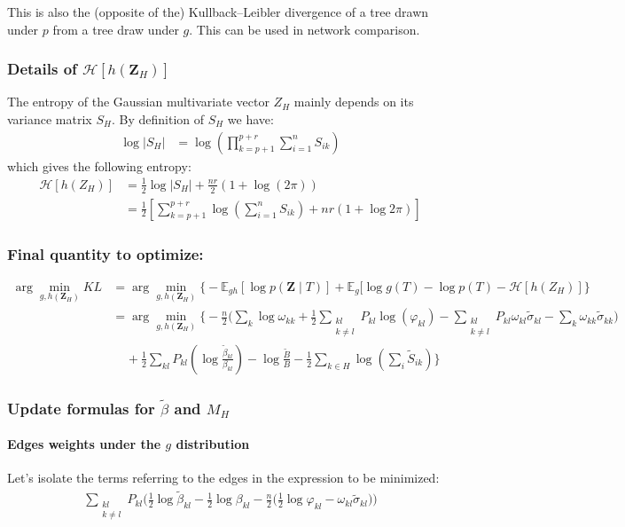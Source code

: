 \documentclass[11pt,a4paper]{article}
\newcommand{\argmin}{\arg\!\min}
\newcommand{\entr}{\mathcal{H}}
\newcommand{\Zbf}{\boldsymbol{Z}}
\newcommand{\Esp}{\mathds{E}}
\begin{document}
 
This is also the (opposite of the) Kullback–Leibler divergence of a tree drawn under $p$ from a tree draw under $g$. This can be used in network comparison.
 \subsubsection{Details of $\entr[h(\Zbf_H)]$}
 
 The entropy of the Gaussian multivariate vector $Z_H$ mainly depends on its variance matrix $S_H$. By definition of $S_H$ we have:
 \begin{align*}
 \log |S_H| &= \log(\prod_{k=p+1}^{p+r} \sum_{i=1}^n S_{ik})
\end{align*}
which gives the following entropy:
\begin{align*}
\entr[h(Z_H)]&= \frac{1}{2} \log |S_H| + \frac{nr}{2}(1+\log(2\pi))\\
 &=\frac{1}{2}\left[ \sum_{k=p+1}^{p+r} \log\left(\sum_{i=1}^n S_{ik}\right)+ nr(1+\log 2\pi )\right]
\end{align*}
\subsubsection{Final quantity to optimize:}
\begin{align*}
\argmin_{g,h(\Zbf_H)} KL  &=\argmin_{g,h(\Zbf_H)}  \Big\{-\Esp_{gh}[\log p(\Zbf \mid T) ] + \Esp_g[\log g(T) - \log p(T)-\entr[h(Z_H)]\Big\}\\
&= \argmin_{g,h(\Zbf_H)}  \bigg\{ -\frac{n}{2} \Big( \sum_{k} \log \omega_{kk}+\frac{1}{2}\sum _{\substack{kl\\ k \neq l}} P_{kl} \log (\varphi_{kl}) - \sum_{\substack{kl\\ k \neq l}} P_{kl} \omega_{kl} \widetilde{\sigma}_{kl} - \sum_{k} \omega_{kk} \widetilde{\sigma}_{kk}\Big) \\
& \;\;\;\; + \frac{1}{2}\sum_{kl}P_{kl} \left(\log \frac{\widetilde{\beta}_{kl}}{{\beta}_{kl}}\right) - \log \frac{\widetilde{B}}{B} -\frac{1}{2}\sum_{k\in H} \log\left(\sum_i \widetilde{S}_{ik}\right) \bigg\}
\end{align*}
 
 
\subsubsection{Update formulas for $\widetilde{\beta}$ and $M_H$ }

\paragraph{Edges weights under the $g$ distribution \\}
Let's isolate the terms referring to the edges in the expression to be minimized:
\begin{align*}
  \sum_{\substack{kl\\ k \neq l}} P_{kl}\Big(\frac{1}{2}\log \widetilde{\beta}_{kl} - \frac{1}{2}\log \beta_{kl} - \frac{n}{2} \big( \frac{1}{2} \log \varphi_{kl} -\omega_{kl} \widetilde{\sigma}_{kl} \big)\Big)   
\end{align*}
\end{document}
